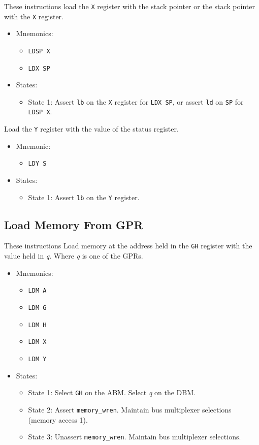 \documentclass[a4paper,12pt]{article}
\newcommand{\Gr}{\texttt{G}}
\newcommand{\Hr}{\texttt{H}}
\newcommand{\Xr}{\texttt{X}}
\newcommand{\Yr}{\texttt{Y}}
\newcommand{\SP}{\texttt{SP}}
\newcommand{\qq}{\textit{q}}
\begin{document}
These instructions load the \Xr{} register with the stack pointer or the
stack pointer with the \Xr{} register.
\par

\begin{itemize}
\item Mnemonics:
\begin{itemize}
	\item \texttt{LDSP X}
	\item \texttt{LDX SP}
\end{itemize}
\item States: 
\begin{itemize}
	\item State 1: Assert \texttt{lb} on the \Xr{} register for 
	\texttt{LDX SP}, or assert \texttt{ld} on \SP{} for \texttt{LDSP X}.
\end{itemize}
\end{itemize}

Load the \Yr{} register with the value of the status register.
\par

\begin{itemize}
\item Mnemonic:
\begin{itemize}
	\item \texttt{LDY S}
\end{itemize}
\item States:
\begin{itemize}
	\item State 1: Assert \texttt{lb} on the \Yr{} register.
\end{itemize}
\end{itemize}

\subsection{Load Memory From GPR}
These instructions Load memory at the address held in the \Gr{}\Hr{} register
with the value held in \qq{}. Where \qq{} is one of the GPRs.
\par

\begin{itemize}
\item Mnemonics:
\begin{itemize}
	\item \texttt{LDM A}
	\item \texttt{LDM G}
	\item \texttt{LDM H}
	\item \texttt{LDM X}
	\item \texttt{LDM Y}
\end{itemize}
\item States:
\begin{itemize}
	\item State 1: Select \Gr{}\Hr{} on the ABM. Select \qq{} on the DBM.
	\item State 2: Assert \texttt{memory\_wren}. Maintain bus multiplexer 
	selections (memory access 1).
	\item State 3: Unassert \texttt{memory\_wren}. Maintain bus multiplexer
	selections.
\end{itemize}
\end{itemize}
\end{document}
